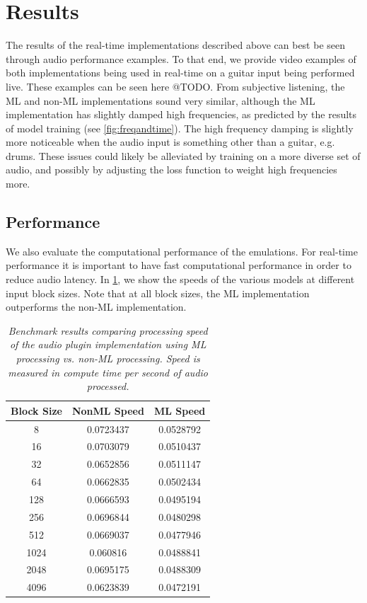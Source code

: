 \documentclass[twoside,a4paper]{article}
\begin{document}
\section{Results}
The results of the real-time implementations described above can best
be seen through audio performance examples. To that end, we provide
video examples of both implementations being used in real-time on a
guitar input being performed live. These examples can be seen here @TODO.
From subjective listening, the ML and non-ML implementations sound
very similar, although the ML implementation has slightly damped
high frequencies, as predicted by the results of model training
(see \cref{fig:freqandtime}). The high frequency damping is slightly
more noticeable when the audio input is something other than a
guitar, e.g. drums. These issues could likely be alleviated
by training on a more diverse set of audio, and possibly by adjusting
the loss function to weight high frequencies more.

\subsection{Performance}
We also evaluate the computational performance of the emulations.
For real-time performance it is important to have fast computational
performance in order to reduce audio latency. In \cref{table:bench},
we show the speeds of the various models at different input block
sizes. Note that at all block sizes, the ML implementation outperforms
the non-ML implementation.
%
\begin{table}[h!]
    \centering
     \begin{tabular}{||c | c | c||} 
     \hline
     Block Size & NonML Speed & ML Speed \\
     \hline\hline
     8    & 0.0723437 & 0.0528792 \\
     16   & 0.0703079 & 0.0510437 \\
     32   & 0.0652856 & 0.0511147 \\
     64   & 0.0662835 & 0.0502434 \\
     128  & 0.0666593 & 0.0495194 \\
     256  & 0.0696844 & 0.0480298 \\
     512  & 0.0669037 & 0.0477946 \\
     1024 & 0.060816  & 0.0488841 \\
     2048 & 0.0695175 & 0.0488309 \\
     4096 & 0.0623839 & 0.0472191 \\
     \hline
     \end{tabular}
    \caption{\label{table:bench} {\it Benchmark results
        comparing processing speed of the audio plugin
        implementation using ML processing vs. non-ML
        processing. Speed is measured in compute time per
        second of audio processed.}}
\end{table}
\end{document}
